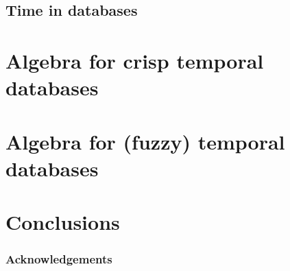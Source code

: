 \documentclass{llncs}
\begin{document}
\subsection{Time in databases}
%


%
\section{\label{sec:proposal}Algebra for crisp temporal databases}
%




\section{Algebra for (fuzzy) temporal databases}



%
\section{\label{sec:conc}Conclusions}
%
%
%
\subsubsection{Acknowledgements}
%






\end{document}
